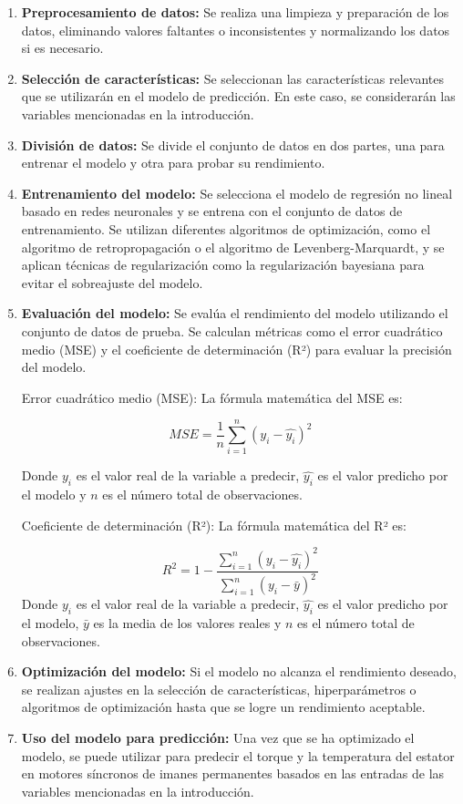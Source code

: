 \documentclass{article}
\begin{document}
\begin{enumerate}
\item \textbf{Preprocesamiento de datos:} Se realiza una limpieza y preparación de los datos, eliminando valores faltantes o inconsistentes y normalizando los datos si es necesario.
\item \textbf{Selección de características:} Se seleccionan las características relevantes que se utilizarán en el modelo de predicción. En este caso, se considerarán las variables mencionadas en la introducción.
\item \textbf{División de datos:} Se divide el conjunto de datos en dos partes, una para entrenar el modelo y otra para probar su rendimiento.
\item \textbf{Entrenamiento del modelo:} Se selecciona el modelo de regresión no lineal basado en redes neuronales y se entrena con el conjunto de datos de entrenamiento. Se utilizan diferentes algoritmos de optimización, como el algoritmo de retropropagación o el algoritmo de Levenberg-Marquardt, y se aplican técnicas de regularización como la regularización bayesiana para evitar el sobreajuste del modelo.
\item \textbf{Evaluación del modelo:} Se evalúa el rendimiento del modelo utilizando el conjunto de datos de prueba. Se calculan métricas como el error cuadrático medio (MSE) y el coeficiente de determinación (R²) para evaluar la precisión del modelo.

Error cuadrático medio (MSE):
La fórmula matemática del MSE es:

$$MSE = \frac{1}{n} \sum_{i=1}^{n}(y_i - \hat{y_i})^2$$

Donde $y_i$ es el valor real de la variable a predecir, $\hat{y_i}$ es el valor predicho por el modelo y $n$ es el número total de observaciones.

Coeficiente de determinación (R²):
La fórmula matemática del R² es:

$$R^2 = 1 - \frac{\sum_{i=1}^{n}(y_i - \hat{y_i})^2}{\sum_{i=1}^{n}(y_i - \bar{y})^2}$$
Donde $y_i$ es el valor real de la variable a predecir, $\hat{y_i}$ es el valor predicho por el modelo, $\bar{y}$ es la media de los valores reales y $n$ es el número total de observaciones.


\item \textbf{Optimización del modelo:} Si el modelo no alcanza el rendimiento deseado, se realizan ajustes en la selección de características, hiperparámetros o algoritmos de optimización hasta que se logre un rendimiento aceptable.
\item \textbf{Uso del modelo para predicción:} Una vez que se ha optimizado el modelo, se puede utilizar para predecir el torque y la temperatura del estator en motores síncronos de imanes permanentes basados en las entradas de las variables mencionadas en la introducción.
\end{enumerate}
\end{document}
